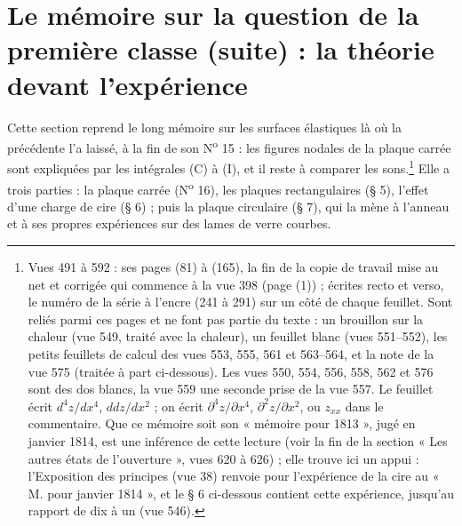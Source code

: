 \documentclass[11pt,a4paper]{article}
\begin{document}
\section*{Le mémoire sur la question de la première classe (suite) : la théorie devant l'expérience}

Cette section reprend le long mémoire sur les surfaces élastiques là où la
précédente l'a laissé, à la fin de son N\textsuperscript{o} 15 : les figures
nodales de la plaque carrée sont expliquées par les intégrales (C) à (I), et il
reste à comparer les sons.\footnote{Vues 491 à 592 : ses pages (81) à (165), la
fin de la copie de travail mise au net et corrigée qui commence à la vue 398
(page (1)) ; écrites recto et verso, le numéro de la série à l'encre (241 à 291)
sur un côté de chaque feuillet. Sont reliés parmi ces pages et ne font pas partie
du texte : un brouillon sur la chaleur (vue 549, traité avec la chaleur), un
feuillet blanc (vues 551--552), les petits feuillets de calcul des vues 553, 555,
561 et 563--564, et la note de la vue 575 (traitée à part ci-dessous). Les vues
550, 554, 556, 558, 562 et 576 sont des dos blancs, la vue 559 une seconde prise
de la vue 557. Le feuillet écrit $d^4z/dx^4$, $ddz/dx^2$ ; on écrit
$\partial^4 z/\partial x^4$, $\partial^2 z/\partial x^2$, ou $z_{xx}$ dans le
commentaire. Que ce mémoire soit son « mémoire pour 1813 », jugé en janvier 1814,
est une inférence de cette lecture (voir la fin de la section « Les autres
états de l'ouverture », vues 620 à 626) ; elle
trouve ici un appui : l'Exposition des principes (vue 38) renvoie pour
l'expérience de la cire au « M. pour janvier 1814 », et le § 6 ci-dessous
contient cette expérience, jusqu'au rapport de dix à un (vue 546).}
Elle a trois parties : la plaque carrée (N\textsuperscript{o} 16), les plaques
rectangulaires (§ 5), l'effet d'une charge de cire (§ 6) ; puis la plaque
circulaire (§ 7), qui la mène à l'anneau et à ses propres expériences sur des
lames de verre courbes.
\end{document}
